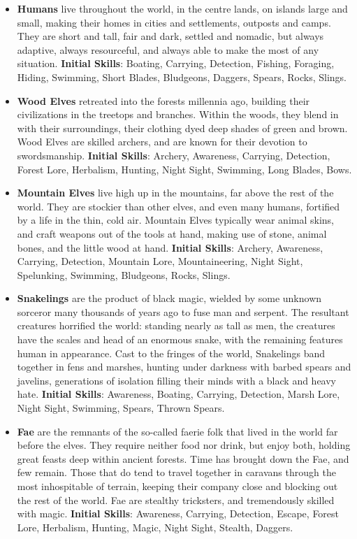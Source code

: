 \begin{itemize}
\item {\bf Humans} live throughout the world, in the centre lands, on
islands large and small, making their homes in cities and settlements, 
outposts and camps.  They are short and tall, fair and dark, settled and 
nomadic, but always adaptive, always resourceful, and always able to make 
the most of any situation. \textbf{Initial Skills}: Boating, Carrying,
Detection, Fishing, Foraging, Hiding, Swimming, Short Blades, Bludgeons,
Daggers, Spears, Rocks, Slings.

\item {\bf Wood Elves} retreated into the forests millennia ago, building 
their civilizations in the treetops and branches.  Within the woods, they 
blend in with their surroundings, their clothing dyed deep shades of green 
and brown.  Wood Elves are skilled archers, and are known for their 
devotion to swordsmanship. \textbf{Initial Skills}: Archery, Awareness,
Carrying, Detection, Forest Lore, Herbalism, Hunting, Night Sight, Swimming,
Long Blades, Bows.

\item {\bf Mountain Elves} live high up in the mountains, far above the 
rest of the world.  They are stockier than other elves, and even many 
humans, fortified by a life in the thin, cold air.  Mountain Elves 
typically wear animal skins, and craft weapons out of the tools at hand, 
making use of stone, animal bones, and the little wood at hand.
\textbf{Initial Skills}: Archery, Awareness, Carrying, Detection, 
Mountain Lore, Mountaineering, Night Sight, Spelunking, Swimming,
Bludgeons, Rocks, Slings.

\item {\bf Snakelings} are the product of black magic, wielded by some
unknown sorceror many thousands of years ago to fuse man and serpent. 
The resultant creatures horrified the world: standing nearly as tall as men,
the creatures have the scales and head of an enormous snake, with the 
remaining features human in appearance.  Cast to the fringes of the world, 
Snakelings band together in fens and marshes, hunting under darkness with 
barbed spears and javelins, generations of isolation filling their minds 
with a black and heavy hate. \textbf{Initial Skills}: Awareness, Boating,
Carrying, Detection, Marsh Lore, Night Sight, Swimming, Spears, Thrown
Spears.

\item {\bf Fae} are the remnants of the so-called faerie folk that lived in
the world far before the elves.  They require neither food nor drink, but 
enjoy both, holding great feasts deep within ancient forests.  Time has 
brought down the Fae, and few remain.  Those that do tend to travel 
together in caravans through the most inhospitable of terrain, keeping 
their company close and blocking out the rest of the world.  Fae are 
stealthy tricksters, and tremendously skilled with magic. 
\textbf{Initial Skills}: Awareness, Carrying, Detection, Escape, Forest
Lore, Herbalism, Hunting, Magic, Night Sight, Stealth, Daggers.


\end{itemize}
